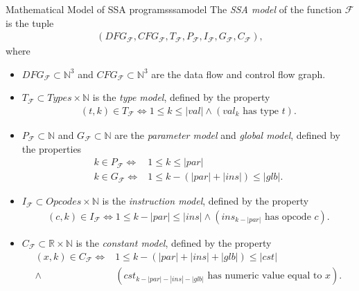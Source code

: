 \begin{definition}{Mathematical Model of SSA programs}{ssamodel}
    The {\em SSA model} of the function $\mathcal F$ is the tuple
    \begin{align*}
        (DFG_\mathcal{F},
         CFG_\mathcal{F},
         T_\mathcal{F},
         P_\mathcal{F},
         I_\mathcal{F},
         G_\mathcal{F},
         C_\mathcal{F}),
    \end{align*}
    where

    \begin{itemize}
    \item $DFG_\mathcal{F}\subset\mathbb N^3$ and
          $CFG_\mathcal{F}\subset\mathbb N^3$ are the data flow and control
          flow graph.
    \item $T_\mathcal F\subset Types\times\mathbb N$ is the {\it type model},
          defined by the property
          \begin{align*}
              (t,k)\in T_\mathcal F\iff 1\leq k\leq |val|
                  \mathrel{\land}(val_k\text{ has type }t).
          \end{align*}
    \item $P_\mathcal F\subset\mathbb N$ and $G_\mathcal F\subset\mathbb N$
          are the {\it parameter model} and {\it global model}, defined by the
          properties
          \begin{align*}
              k\in P_\mathcal F\iff&1\leq k\leq|par|\\
              k\in G_\mathcal F\iff&1\leq k-(|par|+|ins|)\leq|glb|.
          \end{align*}
    \item $I_\mathcal F\subset Opcodes\times \mathbb N$ is the
          {\it instruction model}, defined by the property
          \begin{align*}
              (c,k)\in I_\mathcal F\iff1\leq k-|par|\leq|ins|
                  \mathrel{\land}(ins_{k-|par|}\text{ has opcode }c).
          \end{align*}
    \item $C_\mathcal F\subset\mathbb R\times\mathbb N$ is the
          {\it constant model}, defined by the property
          \begin{align*}
              (x,k)\in C_\mathcal F\iff{}&1\leq k-(|par|+|ins|+|glb|)\leq |cst|\\
                        \mathrel{\land}{}&(cst_{k-|par|-|ins|-|glb|}
                        \text{ has numeric value equal to }x).
          \end{align*}
    \end{itemize}
\end{definition}

